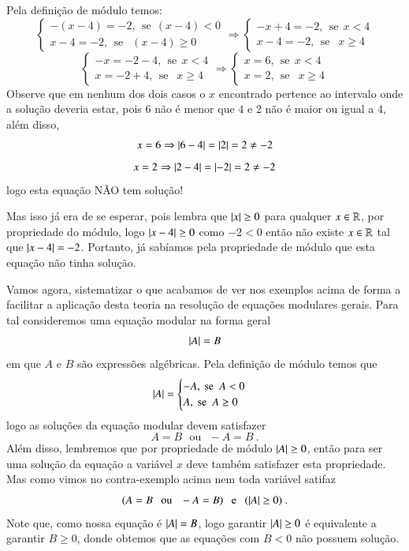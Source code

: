 \begin{exem}
\begin{enumerate}
     Pela definição de módulo temos:
     \[
    \begin{cases}
      -(x-4)= -2, \ \ \text{se} \ \ (x-4) < 0 \\
        x-4 = -2, \ \ \text{se } \ \ (x-4) \geq 0
     \end{cases}
     \Rightarrow
     \begin{cases}
      -x+4= -2, \ \ \text{se} \ \ x < 4 \\
       x-4= -2, \ \ \text{se } \ \ x \geq 4
     \end{cases}
     \]
     \[
     \begin{cases}
      -x= -2-4, \ \ \text{se} \ \ x < 4 \\
       x= -2+4, \ \ \text{se } \ \ x \geq 4
     \end{cases}
     \Rightarrow
     \begin{cases}
      x= 6, \ \ \text{se} \ \ x < 4 \\
      x= 2, \ \ \text{se } \ \ x \geq 4
     \end{cases}
     \]
 Observe que em nenhum dos dois casos o $x$ encontrado pertence ao intervalo onde a solução deveria estar, pois $6$ não é menor que $4$ e $2$ não é maior ou igual a $4$, além disso,
 \[x=6 \Rightarrow \left|6-4\right|= \left|2\right|= 2 \neq -2\]
 \[x=2 \Rightarrow \left|2-4\right|= \left|-2\right|= 2 \neq -2\]
 logo esta equação NÃO tem solução!

 Mas isso já era de se esperar, pois lembra que $\left|x\right|\geq 0$ para qualquer $x \in \mathbb{R}$, por propriedade do módulo, logo $\left|x-4\right| \geq 0$ como $-2< 0$ então não existe $x \in \mathbb{R}$ tal que $\left|x-4\right|= -2$. Portanto, já sabíamos pela propriedade de módulo que esta equação não tinha solução.

\end{enumerate}
\end{exem}

 Vamos agora, sistematizar o que acabamos de ver nos exemplos acima de forma a facilitar a aplicação desta teoria na resolução de equações modulares gerais. Para tal consideremos uma equação modular na forma geral
 \[\left|A\right|= B\]
 em que $A$ e $B$ são expressões algébricas. Pela definição de módulo temos que
 \[ \left|A\right|= \begin{cases}
          -A, \ \text{se} \ \ A < 0 \\
           A, \ \text{se} \ \ A \geq 0
         \end{cases}
 \]
 logo as soluções da equação modular devem satisfazer
 \[A= B \ \ \ \text{ou} \ \ \ -A= B \ .\]
 Além disso, lembremos que por propriedade de módulo $\left|A\right|\geq 0$, então para ser uma solução da equação a variável $x$ deve também satisfazer esta propriedade. Mas como vimos no contra-exemplo acima nem toda variável satifaz
 \[(A= B \ \ \ \text{ou} \ \ \ -A= B) \ \ \ \text{e} \ \ \ (\left|A\right|\geq 0) \ . \]
 Note que, como nossa equação é $\left|A\right|= B$, logo garantir $\left|A\right|\geq 0$ é equivalente a garantir $B \geq 0$, donde obtemos que as equações com $B < 0$ não possuem solução.


